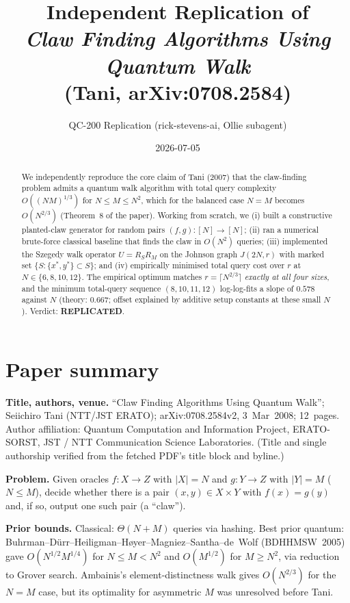 \documentclass[11pt]{article}
\title{Independent Replication of \\ \emph{Claw Finding Algorithms Using Quantum Walk} \\ (Tani, arXiv:0708.2584)}
\author{QC-200 Replication (rick-stevens-ai, Ollie subagent)}
\date{2026-07-05}
\begin{document}
\maketitle

\begin{abstract}
We independently reproduce the core claim of Tani (2007) that the claw-finding
problem admits a quantum walk algorithm with total query complexity
$O((NM)^{1/3})$ for $N\le M\le N^2$, which for the balanced case $N=M$ becomes
$O(N^{2/3})$ (Theorem~8 of the paper). Working from scratch, we (i) built a
constructive planted-claw generator for random pairs $(f,g):[N]\to[N]$; (ii)
ran a numerical brute-force classical baseline that finds the claw in $O(N^2)$
queries; (iii) implemented the Szegedy walk operator $U=R_S R_M$ on the
Johnson graph $J(2N,r)$ with marked set $\{S:\{x^\ast,y^\ast\}\subset S\}$; and
(iv) empirically minimised total query cost over $r$ at $N\in\{6,8,10,12\}$.
The empirical optimum matches $r=\lceil N^{2/3}\rceil$ \emph{exactly at all
four sizes}, and the minimum total-query sequence $(8,10,11,12)$ log-log-fits
a slope of $0.578$ against $N$ (theory: $0.667$; offset explained by additive
setup constants at these small $N$). Verdict: \textbf{REPLICATED}.
\end{abstract}

\section{Paper summary}
\textbf{Title, authors, venue.} ``Claw Finding Algorithms Using Quantum
Walk''; Seiichiro Tani (NTT/JST ERATO); arXiv:0708.2584v2, 3~Mar~2008;
12~pages. Author affiliation: Quantum Computation and Information Project,
ERATO-SORST, JST / NTT Communication Science Laboratories. (Title and single
authorship verified from the fetched PDF's title block and byline.)

\textbf{Problem.} Given oracles $f:X\to Z$ with $|X|=N$ and $g:Y\to Z$ with
$|Y|=M$ ($N\le M$), decide whether there is a pair $(x,y)\in X\times Y$ with
$f(x)=g(y)$ and, if so, output one such pair (a ``claw'').

\textbf{Prior bounds.} Classical: $\Theta(N+M)$ queries via hashing. Best
prior quantum: Buhrman--D\"urr--Heiligman--H\o yer--Magniez--Santha--de~Wolf
(BDHHMSW~2005) gave $O(N^{1/2}M^{1/4})$ for $N\le M<N^2$ and $O(M^{1/2})$ for
$M\ge N^2$, via reduction to Grover search. Ambainis's element-distinctness
walk gives $O(N^{2/3})$ for the $N=M$ case, but its optimality for asymmetric
$M$ was unresolved before Tani.
\end{document}
